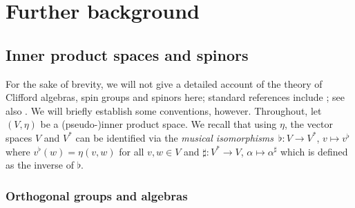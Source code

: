 \appendix

\section{Further background}
\label{app:further-background}

\subsection{Inner product spaces and spinors}
\label{sec:inner-products-spinors}

For the sake of brevity, we will not give a detailed account of the theory of Clifford algebras, spin groups and spinors here; standard references include \cite{Harvey1990,Lawson1989}; see also \cite{JMF-spin}. We will briefly establish some conventions, however. Throughout, let $(V,\eta)$ be a (pseudo-)inner product space.
We recall that using $\eta$, the vector spaces $V$ and $V^*$ can be identified via the \emph{musical isomorphisms}~${\flat\colon V\to V^*}$, $v\mapsto v^\flat$ where
$v^\flat(w) = \eta(v,w)
$
for all $v,w\in V$ and $\sharp\colon V^*\to V$, $\alpha\mapsto\alpha^\sharp$ which is defined as the inverse of $\flat$.

\subsubsection{Orthogonal groups and algebras}
\label{sec:orth-groups-algs}

